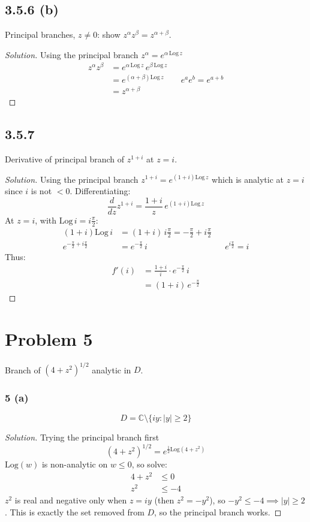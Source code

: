 \documentclass{article}
\newenvironment{solution}{
\begin{proof}[Solution]}{
\end{proof}}
\begin{document}
\subsection*{3.5.6 (b)}
Principal branches, $z \ne 0$: show $z^\alpha z^\beta = z^{\alpha + \beta}$.
\begin{solution}
  Using the principal branch $z^{\alpha}=e^{\alpha\,\text{Log}\, z}$
  \begin{align*}
    z^{\alpha}z^{\beta} & = e^{\alpha\,\text{Log}\, z}\,e^{\beta\,\text{Log}\, z} \\
    & = e^{(\alpha+\beta)\text{Log}\, z} && e^{a}e^{b}=e^{a+b} \\
    & = z^{\alpha+\beta}
  \end{align*}
\end{solution}

\subsection*{3.5.7}
Derivative of principal branch of $z^{1+i}$ at $z = i$.
\begin{solution}
  Using the principal branch $z^{1+i}=e^{(1+i)\text{Log}\, z}$ which is analytic at $z=i$ since $i$ is not $< 0$.
  Differentiating:
  \[
    \frac{d}{dz}z^{1+i}=\frac{1+i}{z}\,e^{(1+i)\text{Log}\, z}
  \]
  At $z=i$, with $\text{Log}\, i=i\frac{\pi}{2}$:
  \begin{align*}
    (1+i)\text{Log}\, i & = (1+i)\,i\frac{\pi}{2}=-\frac{\pi}{2}+i\frac{\pi}{2} \\
    e^{-\frac{\pi}{2}+i\frac{\pi}{2}} & = e^{-\frac{\pi}{2}}\,i && e^{i\frac{\pi}{2}}=i
  \end{align*}
  Thus:
  \begin{align*}
    f'(i) & = \frac{1+i}{i}\cdot e^{-\frac{\pi}{2}}\,i \\
    & = (1+i)\,e^{-\frac{\pi}{2}}
  \end{align*}
\end{solution}

\section*{Problem 5}
Branch of $(4 + z^2)^{1/2}$ analytic in $D$.

\subsubsection*{5 (a)}
\[ D = \mathbb{C} \setminus \{iy : |y| \ge 2\} \]
\begin{solution}
  Trying the principal branch first
  \[
    (4+z^2)^{1/2}=e^{\frac{1}{2}\text{Log}(4+z^2)}
  \]
  $\text{Log}(w)$ is non-analytic on $w\leq0$, so solve:
  \begin{align*}
    4+z^2 & \leq 0 \\
    z^2 & \leq -4
  \end{align*}
  $z^2$ is real and negative only when $z=iy$ (then $z^2=-y^2$), so $-y^2\leq-4 \implies |y|\geq2$.
  This is exactly the set removed from $D$, so the principal branch works.
\end{solution}
\end{document}
